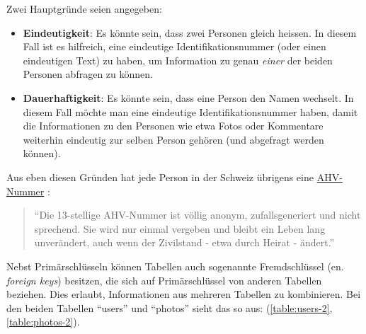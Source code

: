 Zwei Hauptgründe seien angegeben:

\begin{itemize}
\item \textbf{Eindeutigkeit}: Es könnte sein, dass zwei Personen gleich heissen. In diesem Fall ist es hilfreich, eine eindeutige Identifikationsnummer (oder einen eindeutigen Text) zu haben, um Information zu genau \textit{einer} der beiden Personen abfragen zu können.
\item \textbf{Dauerhaftigkeit}: Es könnte sein, dass eine Person den Namen wechselt. In diesem Fall möchte man eine eindeutige Identifikationsnummer haben, damit die Informationen zu den Personen wie etwa Fotos oder Kommentare weiterhin eindeutig zur selben Person gehören (und abgefragt werden können).
\end{itemize}

Aus eben diesen Gründen hat jede Person in der Schweiz übrigens eine \href{https://www.bsv.admin.ch/bsv/de/home/sozialversicherungen/ahv/grundlagen-gesetze/ahv-nummer.html}{AHV-Nummer} : \begin{quote}
  \enquote{Die 13-stellige AHV-Nummer ist völlig anonym, zufallsgeneriert und nicht sprechend. Sie wird nur einmal vergeben und bleibt ein Leben lang unverändert, auch wenn der Zivilstand - etwa durch Heirat - ändert.}
\end{quote}


Nebst Primärschlüsseln können Tabellen auch sogenannte Fremdschlüssel (en. \textit{foreign keys}) besitzen, die sich auf Primärschlüssel von anderen Tabellen beziehen. Dies erlaubt, Informationen aus mehreren Tabellen zu kombinieren. Bei den beiden Tabellen \enquote{users} und \enquote{photos} sieht das so aus: (\cref{table:users-2}, \cref{table:photos-2}).

